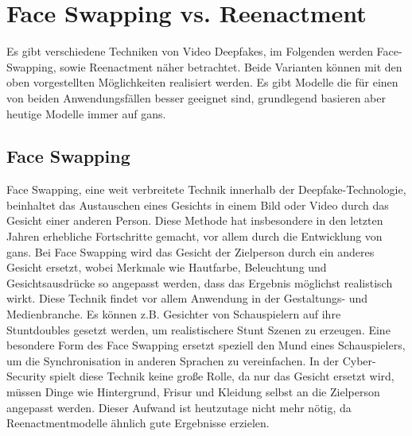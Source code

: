 \section{Face Swapping vs. Reenactment}\label{sec:face-swapping-vs.-reenactment}
Es gibt verschiedene Techniken von Video Deepfakes, im Folgenden werden Face-Swapping, sowie Reenactment näher betrachtet.
Beide Varianten können mit den oben vorgestellten Möglichkeiten realisiert werden.
Es gibt Modelle die für einen von beiden Anwendungsfällen besser geeignet sind, grundlegend basieren aber heutige Modelle immer auf \glspl{gan}.

\subsection{Face Swapping}\label{subsec:face-swapping}
Face Swapping, eine weit verbreitete Technik innerhalb der Deepfake-Technologie, beinhaltet das Austauschen eines
Gesichts in einem Bild oder Video durch das Gesicht einer anderen Person.
Diese Methode hat insbesondere in den letzten Jahren erhebliche Fortschritte gemacht, vor allem durch die Entwicklung von \glspl{gan}.
Bei Face Swapping wird das Gesicht der Zielperson durch ein anderes Gesicht ersetzt, wobei Merkmale wie Hautfarbe,
Beleuchtung und Gesichtsausdrücke so angepasst werden, dass das Ergebnis möglichst realistisch wirkt.
Diese Technik findet vor allem Anwendung in der Gestaltungs- und Medienbranche.
Es können z.B. Gesichter von Schauspielern auf ihre Stuntdoubles gesetzt werden, um realistischere Stunt Szenen zu erzeugen.
Eine besondere Form des Face Swapping ersetzt speziell den Mund eines Schauspielers, um die Synchronisation in anderen Sprachen zu vereinfachen\cite{Deepfakes-An-Overview}.
In der Cyber-Security spielt diese Technik keine große Rolle, da nur das Gesicht ersetzt wird, müssen Dinge wie Hintergrund, Frisur und Kleidung selbst an die Zielperson angepasst werden.
Dieser Aufwand ist heutzutage nicht mehr nötig, da Reenactmentmodelle ähnlich gute Ergebnisse erzielen.

